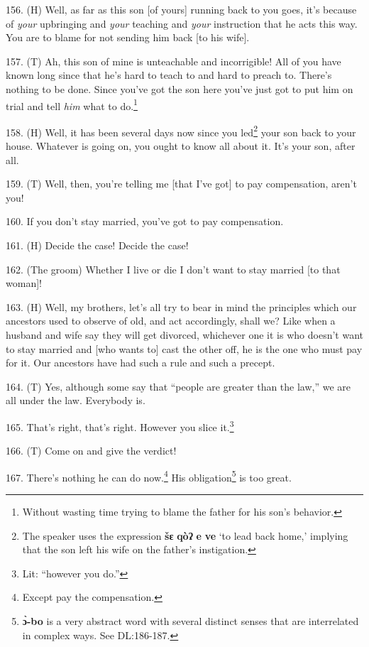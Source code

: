 156. (H)  Well, as far as
this son [of yours] running back to you goes, it's because of \textit{your} upbringing
and \textit{your} teaching and \textit{your} instruction that he acts this way.
You are to blame for not sending him back [to his wife].

157. (T)  Ah, this son of mine
is unteachable and incorrigible! All of you have known long since that he's hard
to teach to and hard to preach to. There's nothing to be done. Since you've got
the son\textit{ }here you've just got to put him on trial and tell \textit{him}
what to do.\footnote{Without wasting time trying to blame the father for his son's behavior.}

158. (H) Well, it has been several days now since you led\footnote{The speaker uses the expression \textbf{šɛ} \textbf{qòʔ} \textbf{e} \textbf{ve} `to lead back home,' implying that the son left his wife on the father's instigation.} your son back to
your house. Whatever is going on, you ought to know all about it. It's your son,
after all.

159. (T) Well, then, you're telling me [that I've got] to pay compensation, aren't
you!

160. If you don't stay married, you've got to pay compensation.

161. (H) Decide the case! Decide the case!

162. (The groom) Whether I live or die I don't want to stay married [to that woman]!

163. (H) Well, my brothers, let's all try to bear in mind the principles which
our ancestors used to observe of old, and act accordingly, shall we? Like when
a husband and wife say they will get divorced, whichever one it is who doesn't
want to stay married and [who wants to] cast the other off, he is the one who must
pay for it. Our ancestors have had such a rule and such a precept.

164. (T) Yes, although some say that ``people are greater than the law,''
we are all under the law. Everybody is.

165. That's right, that's right. However you slice\textbf{ }it.\footnote{Lit: ``however you do.''}

166. (T) Come on and give the verdict!

167. There's nothing he can do now.\footnote{Except pay the compensation.} His obligation\footnote{\textbf{ɔ̀-bo} is a very abstract word with several distinct senses that are interrelated in complex ways. See DL:186-187.} is too great.

